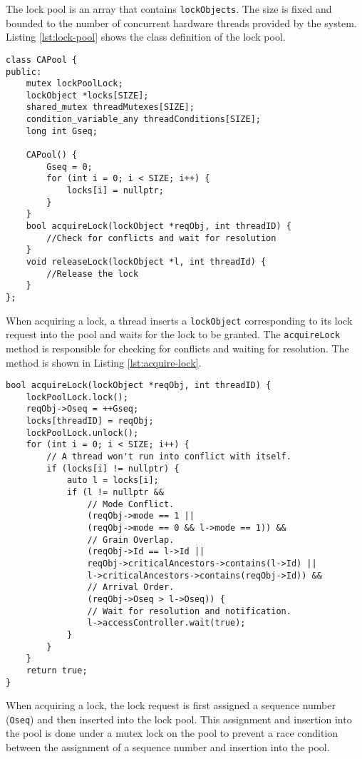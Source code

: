 The lock pool is an array that contains \texttt{lockObjects}. The size is fixed and bounded to the number of concurrent hardware threads provided by the system. Listing \ref{lst:lock-pool} shows the class definition of the lock pool.

\begin{lstlisting}[caption={Lock Pool class}, label={lst:lock-pool}]
class CAPool {
public:
    mutex lockPoolLock;
    lockObject *locks[SIZE];
    shared_mutex threadMutexes[SIZE];
    condition_variable_any threadConditions[SIZE];
    long int Gseq;

    CAPool() {
        Gseq = 0;
        for (int i = 0; i < SIZE; i++) {
            locks[i] = nullptr;
        }
    }
    bool acquireLock(lockObject *reqObj, int threadID) {
        //Check for conflicts and wait for resolution
    }
    void releaseLock(lockObject *l, int threadId) {
        //Release the lock
    }
};
\end{lstlisting}


When acquiring a lock, a thread inserts a \texttt{lockObject} corresponding to its lock request into the pool and waits for the lock to be granted. The \texttt{acquireLock} method is responsible for checking for conflicts and waiting for resolution. The method is shown in Listing \ref{lst:acquire-lock}.

\begin{lstlisting}[caption={Acquiring a lock}, label={lst:acquire-lock}]
bool acquireLock(lockObject *reqObj, int threadID) {
    lockPoolLock.lock();
    reqObj->Oseq = ++Gseq;
    locks[threadID] = reqObj;
    lockPoolLock.unlock();
    for (int i = 0; i < SIZE; i++) {
        // A thread won't run into conflict with itself.
        if (locks[i] != nullptr) {
            auto l = locks[i];
            if (l != nullptr &&
                // Mode Conflict.
                (reqObj->mode == 1 || 
                (reqObj->mode == 0 && l->mode == 1)) &&
                // Grain Overlap.
                (reqObj->Id == l->Id ||
                reqObj->criticalAncestors->contains(l->Id) ||
                l->criticalAncestors->contains(reqObj->Id)) &&
                // Arrival Order.
                (reqObj->Oseq > l->Oseq)) {
                // Wait for resolution and notification.
                l->accessController.wait(true);
            }
        }
    }
    return true;
}
\end{lstlisting}

When acquiring a lock, the lock request is first assigned a sequence number (\texttt{Oseq}) and then inserted into the lock pool. This assignment and insertion into the pool is done under a mutex lock on the pool to prevent a race condition between the assignment of a sequence number and insertion into the pool. 

